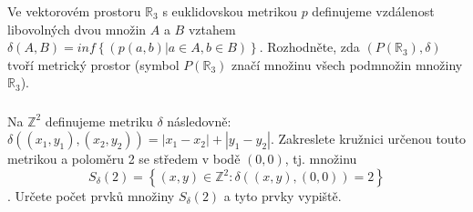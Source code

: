 \subsubsection{}
Ve vektorovém prostoru $\mathbb{R}_{3}$ s euklidovskou metrikou $p$ definujeme
vzdálenost libovolných dvou množin $A$ a $B$ vztahem $\delta(A,B) = inf \left \{  (p(a,b)|a \in A, b \in B )\right \}$. Rozhodněte, zda $(P(\mathbb{R}_{3}), \delta)$
tvoří metrický prostor (symbol $P(\mathbb{R}_{3})$ značí množinu všech podmnožin
množiny $\mathbb{R}_{3}$).
\subsubsection{}
Na $\mathbb{Z}^{2}$ definujeme metriku $\delta$ následovně: $\delta
((x_{1},y_{1}),(x_{2},y_{2}))=\left | x_{1}-x_{2} \right |+\left | y_{1}-y_{2}
\right |$. Zakreslete kružnici určenou touto metrikou a poloměru 2 se středem v
bodě $(0,0)$, tj. množinu 
$$S_{\delta}(2) = \left \{ (x,y) \in \mathbb{Z}^{2}:
\delta((x,y),(0,0))=2 \right \}$$. 
Určete počet prvků množiny $S_{\delta}(2)$ a tyto prvky vypiště.

